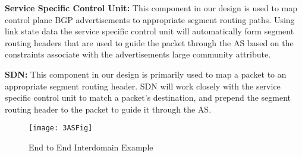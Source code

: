 \textbf{Service Specific Control Unit:} This component in our design is used to map control plane
BGP advertisements to appropriate segment routing paths. Using link state data the service specific 
control unit will automatically form segment routing headers that are used to guide the packet through
the AS based on the constraints associate with the advertisements large community attribute. 

\textbf{SDN:} This component in our design is primarily used to map a packet to an appropriate 
segment routing header. SDN will work closely with the service specific control unit to match 
a packet's destination, and prepend the segment routing header to the packet to guide it through 
the AS.
\begin{figure}
  \centering
  \texttt{[image: 3ASFig]}
  \caption{End to End Interdomain Example}
  \label{fig:example3}
\end{figure}
















































